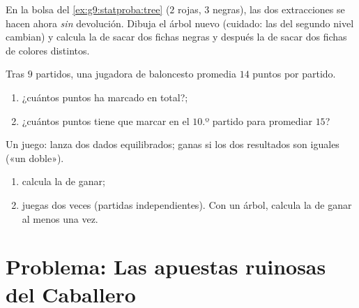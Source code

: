 \begin{exercise}[$\star\star$]\label{exo:g9:statproba:7}
En la bolsa del \cref{ex:g9:statproba:tree} ($2$ rojas, $3$ negras), las dos
extracciones se hacen ahora \emph{sin} devolución. Dibuja el árbol nuevo
(cuidado: las  del segundo nivel cambian) y calcula la
 de sacar dos fichas negras y después la de sacar dos fichas de colores
distintos.
\end{exercise}

\begin{exercise}[$\star\star$]\label{exo:g9:statproba:8}
Tras $9$ partidos, una jugadora de baloncesto promedia $14$ puntos por partido.
\begin{enumerate}
  \item ¿cuántos puntos ha marcado en total?;
  \item ¿cuántos puntos tiene que marcar en el $10$.º partido para promediar
        $15$?
\end{enumerate}
\end{exercise}

\begin{exercise}[$\star\star\star$]\label{exo:g9:statproba:9}
Un juego: lanza dos dados equilibrados; ganas si los dos resultados son iguales
(«un doble»).
\begin{enumerate}
  \item calcula la  de ganar;
  \item juegas dos veces (partidas independientes). Con un árbol, calcula la
         de ganar al menos una vez.
\end{enumerate}
\end{exercise}

\section{Problema: Las apuestas ruinosas del Caballero}

